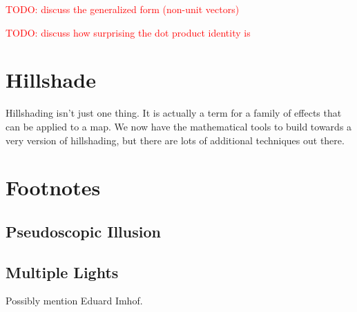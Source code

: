 \documentclass{article}
\newcommand\todo[1]{\textcolor{red}{TODO: #1}}
\begin{document}
\todo{discuss the generalized form (non-unit vectors)}

\todo{discuss how surprising the dot product identity is}

\section{Hillshade}

Hillshading isn't just one thing.
It is actually a term for a family of effects that can be applied to a map.
We now have the mathematical tools to build towards a very version of hillshading, but there are lots of additional techniques out there.

\section{Footnotes}

\subsection{Pseudoscopic Illusion}

\subsection{Multiple Lights}

Possibly mention Eduard Imhof.
	
\end{document}
